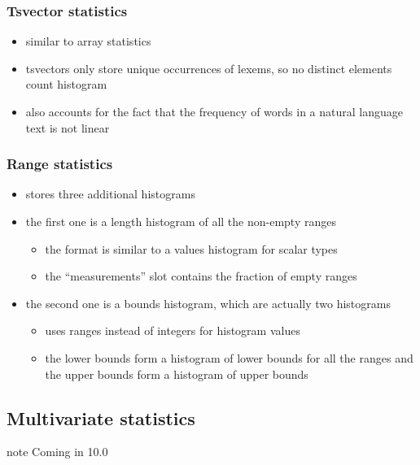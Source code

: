 \documentclass{beamer}
\begin{document}
\begin{frame}
  \frametitle{Tsvector statistics}

  \begin{itemize}
  \item similar to \alert{array statistics}
  \item tsvectors only store \alert{unique occurrences} of lexems, so no distinct
    elements count histogram
  \item also accounts for the fact that the \alert{frequency of words} in a
    natural language text is not linear
  \end{itemize}
\end{frame}

\begin{frame}
  \frametitle{Range statistics}

  \begin{itemize}
  \item stores \alert{three} additional histograms
  \item the first one is a \alert{length histogram} of all the non-empty ranges
    \begin{itemize}
    \item the format is similar to a values histogram for scalar types
    \item the ``measurements'' slot contains the fraction of empty ranges
    \end{itemize}
  \item the second one is a \alert{bounds histogram}, which are actually two
    histograms
    \begin{itemize}
    \item uses ranges instead of integers for histogram values
    \item the \alert{lower bounds} form a histogram of \alert{lower bounds} for
      all the ranges and the \alert{upper bounds} form a histogram of
      \alert{upper bounds}
    \end{itemize}
  \end{itemize}
\end{frame}

\subsection{Multivariate statistics}

\begin{frame}
\begin{beamercolorbox}[center]{note}
  \Huge Coming in 10.0
\end{beamercolorbox}
\end{frame}
\end{document}
